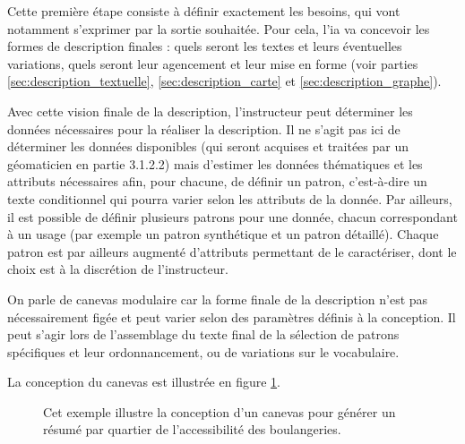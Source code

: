 Cette première étape consiste à définir exactement les besoins, qui vont notamment s’exprimer par la sortie souhaitée. Pour cela, l’\gls{ia} va concevoir les formes de description finales : quels seront les textes et leurs éventuelles variations, quels seront leur agencement et leur mise en forme (voir parties \ref{sec:description_textuelle}, \ref{sec:description_carte} et \ref{sec:description_graphe}).

\newpar{}

Avec cette vision finale de la description, l’instructeur peut déterminer les données nécessaires pour la réaliser la description. Il ne s’agit pas ici de déterminer les données disponibles (qui seront acquises et traitées par un géomaticien en partie 3.1.2.2) mais d’estimer les données thématiques et les attributs nécessaires afin, pour chacune, de définir un patron, c’est-à-dire un texte conditionnel qui pourra varier selon les attributs de la donnée. Par ailleurs, il est possible de définir plusieurs patrons pour une donnée, chacun correspondant à un usage (par exemple un patron synthétique et un patron détaillé). Chaque patron est par ailleurs augmenté d’attributs permettant de le caractériser, dont le choix est à la discrétion de l’instructeur.

\newpar{}

On parle de canevas modulaire car la forme finale de la description n’est pas nécessairement figée et peut varier selon des paramètres définis à la conception. Il peut s’agir lors de l’assemblage du texte final de la sélection de patrons spécifiques et leur ordonnancement, ou de variations sur le vocabulaire.

\newpar{}

La conception du canevas est illustrée en figure \ref{fig:desc_canevas_modulaire}.

\begin{figure}
    \centering
    \caption{Cet exemple illustre la conception d'un canevas pour générer un résumé par quartier de l'accessibilité des boulangeries.}
    \label{fig:desc_canevas_modulaire}
\end{figure}

